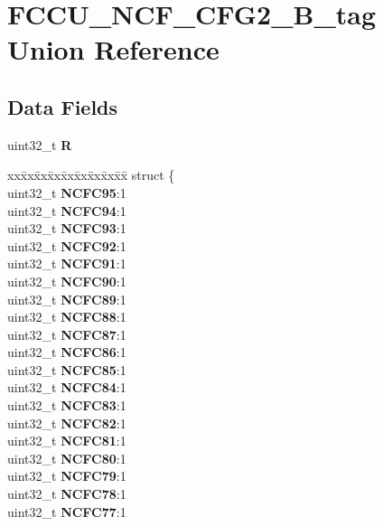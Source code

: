 \hypertarget{unionFCCU__NCF__CFG2__32B__tag}{}\section{F\+C\+C\+U\+\_\+\+N\+C\+F\+\_\+\+C\+F\+G2\+\_\+B\+\_\+tag Union Reference}
\label{unionFCCU__NCF__CFG2__32B__tag}
\subsection*{Data Fields}
\begin{DoxyCompactItemize}
\item 
\mbox{\label{unionFCCU__NCF__CFG2__32B__tag_a86e700f7d01080e538a285d9e8f0a2fb}} 
uint32\+\_\+t {\bfseries R}
\item 
\mbox{\label{unionFCCU__NCF__CFG2__32B__tag_a0db34a03cd473188fb695ffa215fd998}} 
\begin{tabbing}
xx\=xx\=xx\=xx\=xx\=xx\=xx\=xx\=xx\=\kill
struct \{\\
\>uint32\_t {\bfseries NCFC95}:1\\
\>uint32\_t {\bfseries NCFC94}:1\\
\>uint32\_t {\bfseries NCFC93}:1\\
\>uint32\_t {\bfseries NCFC92}:1\\
\>uint32\_t {\bfseries NCFC91}:1\\
\>uint32\_t {\bfseries NCFC90}:1\\
\>uint32\_t {\bfseries NCFC89}:1\\
\>uint32\_t {\bfseries NCFC88}:1\\
\>uint32\_t {\bfseries NCFC87}:1\\
\>uint32\_t {\bfseries NCFC86}:1\\
\>uint32\_t {\bfseries NCFC85}:1\\
\>uint32\_t {\bfseries NCFC84}:1\\
\>uint32\_t {\bfseries NCFC83}:1\\
\>uint32\_t {\bfseries NCFC82}:1\\
\>uint32\_t {\bfseries NCFC81}:1\\
\>uint32\_t {\bfseries NCFC80}:1\\
\>uint32\_t {\bfseries NCFC79}:1\\
\>uint32\_t {\bfseries NCFC78}:1\\
\>uint32\_t {\bfseries NCFC77}:1\\

\end{tabbing}
\end{DoxyCompactItemize}
